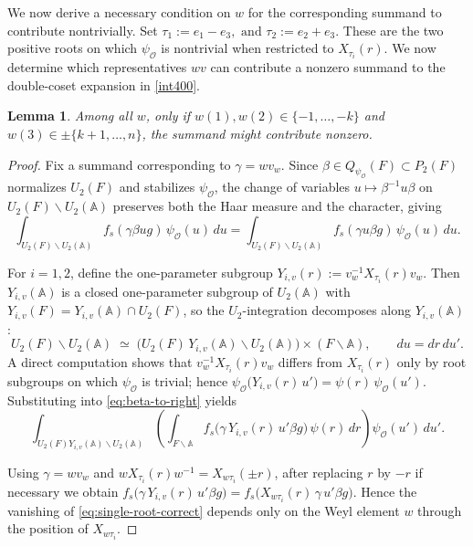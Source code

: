 \documentclass[11pt,notitlepage]{amsart}
\newtheorem{lemma}[theorem]{Lemma}
\theoremstyle{definition}
\theoremstyle{remark}
\newcommand{\calO}{\mathcal{O}}
\newcommand{\bbA}{\mathbb{A}}
\begin{document}
We now derive a necessary condition on $w$ for the corresponding summand to contribute nontrivially. Set
$\tau_1 := e_1 - e_3, \text{ and } \tau_2 := e_2 + e_3.$
These are the two positive roots on which $\psi_\calO$ is nontrivial when restricted to $X_{\tau_i}(r)$. We now determine which representatives $wv$ can contribute a
nonzero summand to the double-coset expansion in \eqref{int400}.
\begin{lemma}
    Among all $w$, only if $w(1),w(2)\in\{-1,\dots,-k\}$ and $w(3)\in \pm\{k+1,\dots,n\}$, the summand might contribute nonzero. 
\end{lemma}
\begin{proof}
Fix a summand corresponding to $\gamma = w v_w$. Since $\beta \in Q_{\psi_\calO}(F) \subset P_2(F)$ normalizes $U_2(F)$ and stabilizes $\psi_\calO$, the change of variables $u \mapsto \beta^{-1} u \beta$ on $U_2(F) \backslash U_2(\bbA)$ preserves both the Haar measure and the character, giving
\begin{equation}\label{eq:beta-to-right}
    \int_{U_2(F) \backslash U_2(\bbA)} f_s(\gamma \beta u g)\, \psi_\calO(u)\, du = \int_{U_2(F) \backslash U_2(\bbA)} f_s(\gamma u \beta g)\, \psi_\calO(u)\, du.
\end{equation}

For $i = 1, 2$, define the one-parameter subgroup
   $ Y_{i, v}(r) := v_w^{-1} X_{\tau_i}(r) v_w$. Then $Y_{i, v}(\bbA)$ is a closed one-parameter subgroup of $U_2(\bbA)$ with $Y_{i, v}(F) = Y_{i, v}(\bbA) \cap U_2(F)$, so the $U_2$-integration decomposes along $Y_{i, v}(\bbA)$:
\[
    U_2(F) \backslash U_2(\bbA) \;\simeq\; \bigl(U_2(F)\, Y_{i, v}(\bbA) \backslash U_2(\bbA)\bigr) \times (F \backslash \bbA), \qquad du = dr \, du'.
\]
A direct computation shows that $v_w^{-1} X_{\tau_i}(r) v_w$ differs from $X_{\tau_i}(r)$ only by root subgroups on which $\psi_\calO$ is trivial; hence
    $\psi_\calO\bigl(Y_{i, v}(r)\, u'\bigr) = \psi(r)\, \psi_\calO(u')$. Substituting into \eqref{eq:beta-to-right} yields
\begin{equation}\label{eq:single-root-correct}
    \int_{U_2(F) Y_{i, v}(\bbA) \backslash U_2(\bbA)} \left( \int_{F \backslash \bbA} f_s\bigl(\gamma\, Y_{i, v}(r)\, u' \beta g\bigr)\, \psi(r)\, dr \right) \psi_\calO(u')\, du'.
\end{equation}

Using $\gamma = w v_w$ and $w X_{\tau_i}(r) w^{-1} = X_{w \tau_i}(\pm r)$, after replacing $r$ by $-r$ if necessary we obtain
$f_s\bigl(\gamma\, Y_{i, v}(r)\, u' \beta g\bigr) = f_s\bigl(X_{w \tau_i}(r)\, \gamma\, u' \beta g\bigr)$. Hence the vanishing of \eqref{eq:single-root-correct} depends only on the Weyl element $w$ through the position of $X_{w \tau_i}$.


\end{proof}
\end{document}
